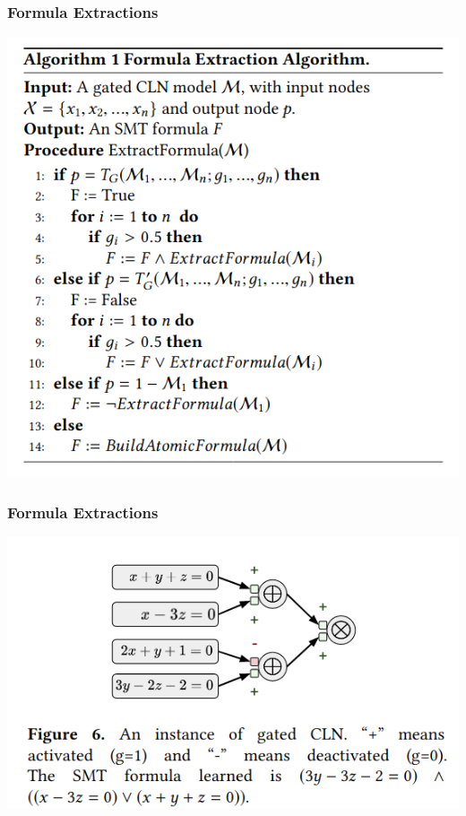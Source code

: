 \documentclass[11pt]{beamer}
\begin{document}
\begin{frame}\frametitle{Formula Extractions}
\begin{center}
\includegraphics[scale=0.4]{8.png}
\end{center}
\end{frame}
\begin{frame}\frametitle{Formula Extractions}
\begin{center}
\includegraphics[scale=0.5]{6.png}
\end{center}
\end{frame}
\end{document}
